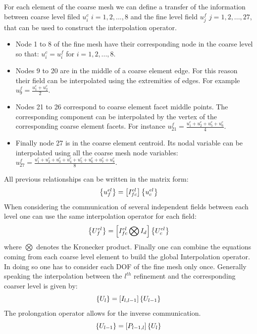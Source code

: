      For each element of the coarse mesh we can define a transfer of the information between coarse level filed $u^c_i$ $i=1,2,...,8$ and the fine level field $u^f_j$ $j=1,2,...,27$, that can be used to construct the interpolation operator. 
     \begin{itemize}
     \item Node 1 to 8 of the fine mesh have their corresponding node in the coarse level so that: $u^c_i=u^f_i$ for $i=1,2,...,8$.
     \item Nodes 9 to 20 are in the middle of a coarse element edge. For this reason their field can be interpolated using the extremities of edges. For example $u^f_9=\frac{u^c_1+u^c_2}{2}$.
     \item Nodes 21 to 26 correspond to coarse element facet middle points. The corresponding component can be interpolated by the vertex of the corresponding coarse element facets. For instance $u^f_{21}=\frac{u^c_1+u^c_2+u^c_5+u^c_6}{4}$.
     \item Finally node 27 is in the coarse element centroid. Its nodal variable can be interpolated using all the coarse mesh node variables: $u^f_{27}=\frac{u^c_1+u^c_2+u^c_3+u^c_4+u^c_5+u^c_6+u^c_7+u^c_8}{8}$.
     \end{itemize}
        All previous relationships can be written in the matrix form: 
     \begin{equation}
     \left\lbrace{u_f^{el}}\right \rbrace=\left[{I_{fc}^{el}}\right]\left\lbrace{u_c^{el}}\right \rbrace
     \end{equation}
     When considering the communication of several independent fields between each level one can use the same interpolation operator for each field:
     \begin{equation}
     \left\lbrace{U_f^{el}}\right \rbrace=\left[{I_{fc}^{el}\bigotimes I_d}\right]\left\lbrace{U_c^{el}}\right \rbrace
     \end{equation}
     where $\bigotimes$ denotes the Kronecker product.
     Finally one can combine the equations coming from each coarse level element to build the global Interpolation operator. In doing so one has to consider each DOF of the fine mesh only once. Generally speaking the interpolation between the $l^{th}$ refinement and the corresponding coarser level is given by: 
      \begin{equation}
      \left\lbrace{U_l}\right \rbrace=\left[{I_{l,l-1}}\right]\left\lbrace{U_{l-1}}\right \rbrace
      \end{equation}
      The prolongation operator allows for the inverse communication.  
 \begin{equation}
       \left\lbrace{U_{l-1}}\right \rbrace=\left[{P_{l-1,l}}\right]\left\lbrace{U_{l}}\right \rbrace
 \end{equation}

